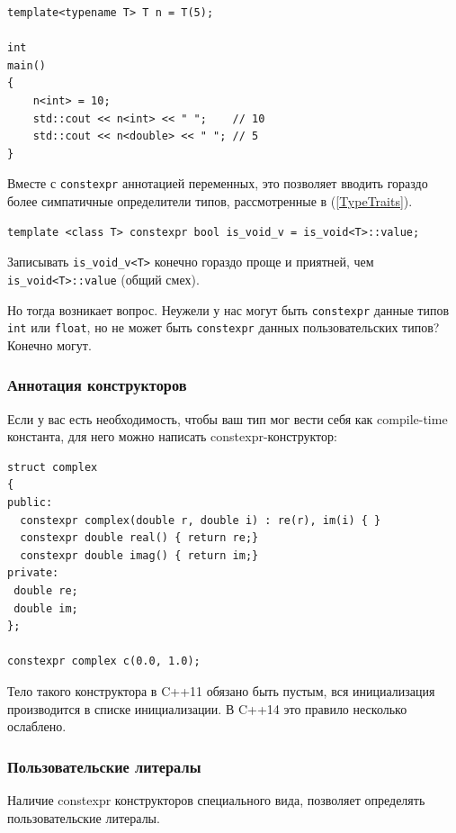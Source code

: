 \documentclass[a4paper,12pt,oneside]{article}
\begin{document}
\begin{lstlisting}
template<typename T> T n = T(5);

int 
main()
{
    n<int> = 10;
    std::cout << n<int> << " ";    // 10
    std::cout << n<double> << " "; // 5
}
\end{lstlisting}

Вместе с \lstinline!constexpr! аннотацией переменных, это позволяет вводить гораздо более симпатичные определители типов, рассмотренные в (\ref{TypeTraits}).

\begin{lstlisting}
template <class T> constexpr bool is_void_v = is_void<T>::value;
\end{lstlisting}

Записывать \lstinline!is_void_v<T>! конечно гораздо проще и приятней, чем \lstinline!is_void<T>::value! (общий смех).

Но тогда возникает вопрос. Неужели у нас могут быть \lstinline!constexpr! данные типов \lstinline!int! или \lstinline!float!, но не может быть \lstinline!constexpr! данных пользовательских типов? Конечно могут.

\subsubsection{Аннотация конструкторов}

Если у вас есть необходимость, чтобы ваш тип мог вести себя как compile-time константа, для него можно написать constexpr-конструктор:

\begin{lstlisting}
struct complex
{
public:
  constexpr complex(double r, double i) : re(r), im(i) { }
  constexpr double real() { return re;}
  constexpr double imag() { return im;}
private:
 double re;
 double im;
};

constexpr complex c(0.0, 1.0);
\end{lstlisting}

Тело такого конструктора в C++11 обязано быть пустым, вся инициализация производится в списке инициализации. В C++14 это правило несколько ослаблено.

\subsubsection{Пользовательские литералы}

Наличие constexpr конструкторов специального вида, позволяет определять пользовательские литералы.
\end{document}
